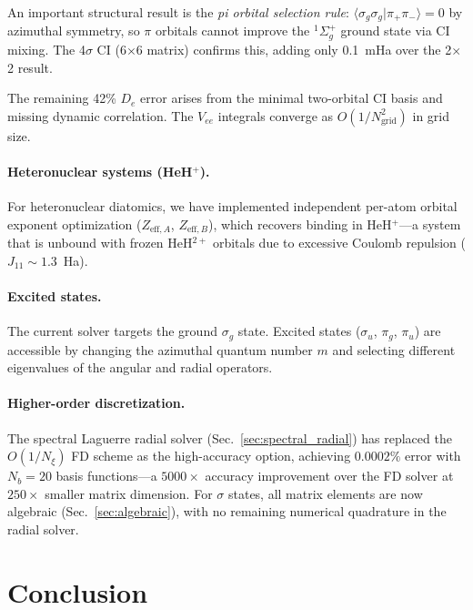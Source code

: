 \documentclass[aps,pra,twocolumn,superscriptaddress,longbibliography]{revtex4-2}
\begin{document}
An important structural result is the \emph{pi orbital selection rule}:
$\langle \sigma_g \sigma_g | \pi_+ \pi_- \rangle = 0$ by azimuthal
symmetry, so $\pi$ orbitals cannot improve the $^1\Sigma_g^+$ ground
state via CI mixing.  The 4$\sigma$ CI (6$\times$6 matrix) confirms
this, adding only 0.1~mHa over the 2$\times$2 result.

The remaining 42\% $D_e$ error arises from the minimal two-orbital
CI basis and missing dynamic correlation.  The $V_{ee}$ integrals
converge as $O(1/N_{\mathrm{grid}}^2)$ in grid size.

\paragraph{Heteronuclear systems (HeH$^+$).}
For heteronuclear diatomics, we have implemented independent
per-atom orbital exponent optimization ($Z_{\mathrm{eff},A}$,
$Z_{\mathrm{eff},B}$), which recovers binding in HeH$^+$---a
system that is unbound with frozen HeH$^{2+}$ orbitals due to
excessive Coulomb repulsion ($J_{11} \sim 1.3$~Ha).

\paragraph{Excited states.}
The current solver targets the ground $\sigma_g$ state.  Excited
states ($\sigma_u$, $\pi_g$, $\pi_u$) are accessible by changing
the azimuthal quantum number $m$ and selecting different eigenvalues
of the angular and radial operators.

\paragraph{Higher-order discretization.}
The spectral Laguerre radial solver (Sec.~\ref{sec:spectral_radial})
has replaced the $O(1/N_\xi)$ FD scheme as the high-accuracy option,
achieving $0.0002\%$ error with $N_b = 20$ basis functions---a
$5000\times$ accuracy improvement over the FD solver at $250\times$
smaller matrix dimension.  For $\sigma$ states, all matrix elements
are now algebraic (Sec.~\ref{sec:algebraic}), with no remaining
numerical quadrature in the radial solver.


\section{Conclusion}
\label{sec:conclusion}
\end{document}
